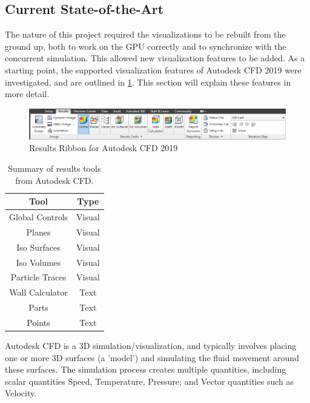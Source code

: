 \subsection{Current State-of-the-Art}
The nature of this project required the visualizations to be rebuilt from the ground up, both to work on the GPU correctly and to synchronize with the concurrent simulation.
This allowed new visualization features to be added.
As a starting point, the supported visualization features of Autodesk CFD 2019 were investigated, and are outlined in \cref{tab:AutodeskCFDSummary}.
This section will explain these features in more detail.

\begin{figure}[ht]
    \centering
    \includegraphics[width=\linewidth]{Ch20Research/figures/results_ribbon.png}
    \caption{Results Ribbon for Autodesk CFD 2019}
    \label{fig:AutodeskCFDRibbon}
\end{figure}

\begin{table}[ht]
    \centering
    \begin{tabular}{c|c}
        Tool & Type \\
        \hline
        Global Controls & Visual \\
        Planes & Visual \\
        Iso Surfaces & Visual \\
        Iso Volumes & Visual \\
        Particle Traces & Visual \\
        \hline
        Wall Calculator & Text \\
        Parts & Text \\
        Points & Text \\
    \end{tabular}
    \caption{Summary of results tools from Autodesk CFD.}
    \label{tab:AutodeskCFDSummary}
\end{table}

Autodesk CFD is a 3D simulation/visualization, and typically involves placing one or more 3D surfaces (a 'model') and simulating the fluid movement around these surfaces.
The simulation process creates multiple quantities, including scalar quantities Speed, Temperature, Pressure; and Vector quantities such as Velocity.

